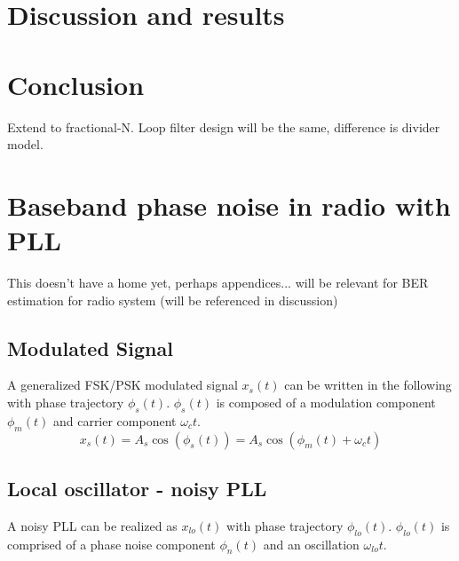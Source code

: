 	

	\section{Discussion and results}\label{disco}
    

    \FloatBarrier

    \section{Conclusion} \label{conclusion}
    Extend to fractional-N. Loop filter design will be the same, difference is divider model.

	\section{Baseband phase noise in radio with PLL}
		This doesn't have a home yet, perhaps appendices... will be relevant for BER estimation for radio system (will be referenced in discussion)

	\subsection{Modulated Signal}
		A generalized FSK/PSK modulated signal $x_s(t)$ can be written in the following with phase trajectory $\phi_s(t)$. $\phi_s(t)$ is composed of a modulation component $\phi_m(t)$ and carrier component $\omega_ct$.
		\begin{equation}
			x_s(t) = A_s\cos(\phi_s(t)) = A_s\cos(\phi_m(t)+\omega_ct)
		\end{equation} 

	\subsection{Local oscillator - noisy PLL}
		A noisy PLL can be realized as $x_{lo}(t)$ with phase trajectory $\phi_{lo}(t)$. $\phi_{lo}(t)$ is comprised of a phase noise component $\phi_{n}(t)$ and an oscillation $\omega_{lo}t$. 

